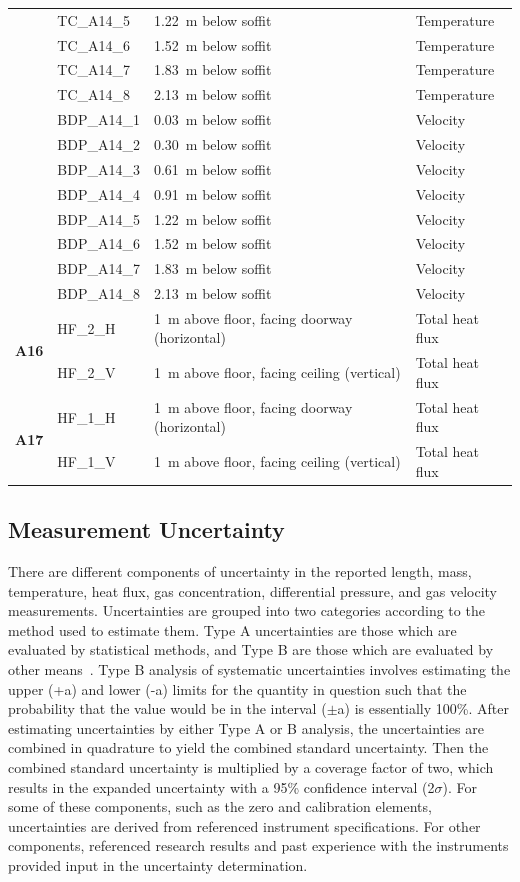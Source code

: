 \documentclass[12pt,oneside]{book}
\begin{document}
\begin{longtable}[c]{c|lll}
 & TC\_A14\_5  & 1.22~m below soffit  & Temperature \\
 & TC\_A14\_6  & 1.52~m below soffit  & Temperature \\
 & TC\_A14\_7  & 1.83~m below soffit  & Temperature \\
 & TC\_A14\_8  & 2.13~m below soffit  & Temperature \\
\cline{2-4}
 & BDP\_A14\_1 & 0.03~m below soffit  & Velocity \\
 & BDP\_A14\_2 & 0.30~m below soffit  & Velocity \\
 & BDP\_A14\_3 & 0.61~m below soffit  & Velocity \\
 & BDP\_A14\_4 & 0.91~m below soffit  & Velocity \\
 & BDP\_A14\_5 & 1.22~m below soffit  & Velocity \\
 & BDP\_A14\_6 & 1.52~m below soffit  & Velocity \\
 & BDP\_A14\_7 & 1.83~m below soffit  & Velocity \\
 & BDP\_A14\_8 & 2.13~m below soffit  & Velocity \\
\midrule
\multirow{2}{*}{\large{\textbf{A16}}}
 & HF\_2\_H	  & 1~m above floor, facing doorway (horizontal)      & Total heat flux \\
 & HF\_2\_V   & 1~m above floor, facing ceiling (vertical)        & Total heat flux \\
\midrule
\multirow{2}{*}{\large{\textbf{A17}}}
 & HF\_1\_H	  & 1~m above floor, facing doorway (horizontal)      & Total heat flux \\
 & HF\_1\_V	  & 1~m above floor, facing ceiling (vertical)        & Total heat flux \\
\bottomrule
\end{longtable}
\clearpage

\subsection{Measurement Uncertainty}
\label{sec:Uncertainty}
There are different components of uncertainty in the reported length, mass, temperature, heat flux, gas concentration, differential pressure, and gas velocity measurements. Uncertainties are grouped into two categories according to the method used to estimate them. Type A uncertainties are those which are evaluated by statistical methods, and Type B are those which are evaluated by other means~\cite{Taylor&Kuyatt:1994}. Type B analysis of systematic uncertainties involves estimating the upper (+a) and lower (-a) limits for the quantity in question such that the probability that the value would be in the interval ($\pm$a) is essentially 100\%. After estimating uncertainties by either Type A or B analysis, the uncertainties are combined in quadrature to yield the combined standard uncertainty. Then the combined standard uncertainty is multiplied by a coverage factor of two, which results in the expanded uncertainty with a 95\% confidence interval (2$\sigma$). For some of these components, such as the zero and calibration elements, uncertainties are derived from referenced instrument specifications. For other components, referenced research results and past experience with the instruments provided input in the uncertainty determination.
\end{document}
